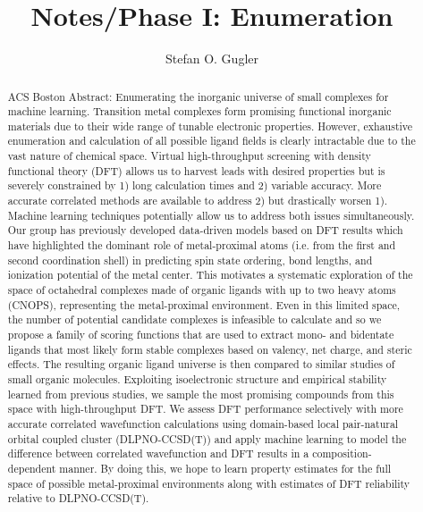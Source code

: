 \documentclass[]{article}
\title{Notes/Phase I: Enumeration}
\author{Stefan O. Gugler}
\begin{document}
\maketitle

\begin{abstract}
ACS Boston Abstract: Enumerating the inorganic universe of small complexes for machine learning. Transition metal complexes form promising functional inorganic materials due to their wide range of tunable electronic properties. However, exhaustive enumeration and calculation of all possible ligand fields is clearly intractable due to the vast nature of chemical space. Virtual high-throughput screening with density functional theory (DFT) allows us to harvest leads with desired properties but is severely constrained by 1) long calculation times and 2) variable accuracy. More accurate correlated methods are available to address 2) but drastically worsen 1). Machine learning techniques potentially allow us to address both issues simultaneously. Our group has previously developed data-driven models based on DFT results which have highlighted the dominant role of metal-proximal atoms (i.e. from the first and second coordination shell) in predicting spin state ordering, bond lengths, and ionization potential of the metal center. This motivates a systematic exploration of the space of octahedral complexes made of organic ligands with up to two heavy atoms (CNOPS), representing the metal-proximal environment. Even in this limited space, the number of potential candidate complexes is infeasible to calculate and so we propose a family of scoring functions that are used to extract mono- and bidentate ligands that most likely form stable complexes based on valency, net charge, and steric effects. The resulting organic ligand universe is then compared to similar studies of small organic molecules. Exploiting isoelectronic structure and empirical stability learned from previous studies, we sample the most promising compounds from this space with high-throughput DFT. We assess DFT performance selectively with more accurate correlated wavefunction calculations using domain-based local pair-natural orbital coupled cluster (DLPNO-CCSD(T)) and apply machine learning to model the difference between correlated wavefunction and DFT results in a composition-dependent manner. By doing this, we hope to learn property estimates for the full space of possible metal-proximal environments along with estimates of DFT reliability relative to DLPNO-CCSD(T).
\end{abstract}
\end{document}
